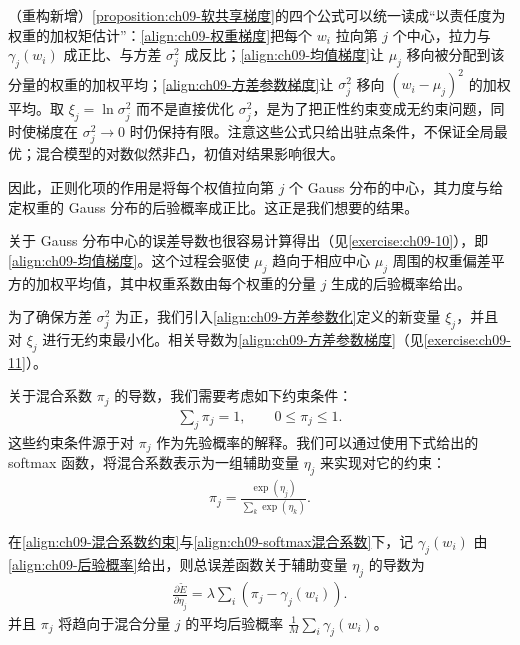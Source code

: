 \documentclass[../../main.tex]{subfiles}
\begin{document}
\begin{remark}（重构新增）\cref{proposition:ch09-软共享梯度}的四个公式可以统一读成“以责任度为权重的加权矩估计”：\eqref{align:ch09-权重梯度}把每个 $w_{i}$ 拉向第 $j$ 个中心，拉力与 $\gamma_{j}(w_{i})$ 成正比、与方差 $\sigma_{j}^{2}$ 成反比；\eqref{align:ch09-均值梯度}让 $\mu_{j}$ 移向被分配到该分量的权重的加权平均；\eqref{align:ch09-方差参数梯度}让 $\sigma_{j}^{2}$ 移向 $(w_{i}-\mu_{j})^{2}$ 的加权平均。取 $\xi_{j}=\ln\sigma_{j}^{2}$ 而不是直接优化 $\sigma_{j}^{2}$，是为了把正性约束变成无约束问题，同时使梯度在 $\sigma_{j}^{2}\to0$ 时仍保持有限。注意这些公式只给出驻点条件，不保证全局最优；混合模型的对数似然非凸，初值对结果影响很大。
\end{remark}

因此，正则化项的作用是将每个权值拉向第 $j$ 个 Gauss 分布的中心，其力度与给定权重的 Gauss 分布的后验概率成正比。这正是我们想要的结果。

关于 Gauss 分布中心的误差导数也很容易计算得出（见\cref{exercise:ch09-10}），即\eqref{align:ch09-均值梯度}。这个过程会驱使 $\mu_{j}$ 趋向于相应中心 $\mu_{j}$ 周围的权重偏差平方的加权平均值，其中权重系数由每个权重的分量 $j$ 生成的后验概率给出。

为了确保方差 $\sigma_{j}^{2}$ 为正，我们引入\eqref{align:ch09-方差参数化}定义的新变量 $\xi_{j}$，并且对 $\xi_{j}$ 进行无约束最小化。相关导数为\eqref{align:ch09-方差参数梯度}（见\cref{exercise:ch09-11}）。

关于混合系数 $\pi_{j}$ 的导数，我们需要考虑如下约束条件：
\begin{align}
\sum_{j}\pi_{j}=1,\qquad 0\leqslant\pi_{j}\leqslant1.
\label{align:ch09-混合系数约束}
\end{align}
这些约束条件源于对 $\pi_{j}$ 作为先验概率的解释。我们可以通过使用下式给出的 softmax 函数，将混合系数表示为一组辅助变量 $\eta_{j}$ 来实现对它的约束：
\begin{align}
\pi_{j}=\frac{\exp(\eta_{j})}{\sum_{k}\exp(\eta_{k})}.
\label{align:ch09-softmax混合系数}
\end{align}

\begin{proposition}[混合系数的梯度]\label{proposition:ch09-混合系数梯度}
在\eqref{align:ch09-混合系数约束}与\eqref{align:ch09-softmax混合系数}下，记 $\gamma_{j}(w_{i})$ 由\eqref{align:ch09-后验概率}给出，则总误差函数关于辅助变量 $\eta_{j}$ 的导数为
\begin{align}
\frac{\partial\widetilde{E}}{\partial\eta_{j}}=\lambda\sum_{i}\left(\pi_{j}-\gamma_{j}(w_{i})\right).
\label{align:ch09-混合系数梯度}
\end{align}
并且 $\pi_{j}$ 将趋向于混合分量 $j$ 的平均后验概率 $\frac{1}{M}\sum_{i}\gamma_{j}(w_{i})$。
\end{proposition}
\end{document}
